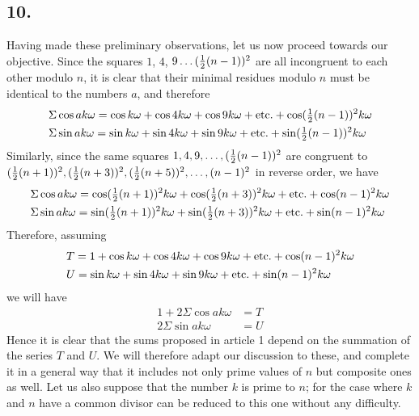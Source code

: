 \documentclass[twoside,12pt]{memoir}
\let\oldfrac\frac
\def\frac#1#2{\mathchoice{\tfrac{#1}{#2}}{\oldfrac{#1}{#2}}{\genfrac{}{}{}{2}{#1}{#2\mathstrut}}{\genfrac{}{}{}{3}{#1}{#2\mathstrut}}}
\begin{document}
\subsection*{10.}

Having made these preliminary observations, let us now proceed towards our objective. Since the squares \(1\), \(4\), \(9 \ldots (\frac{1}{2}(n-1))^2\) are all incongruent to each other modulo \(n\), it is clear that their minimal residues modulo \(n\) must be identical to the numbers \(a\), and therefore
\[\begin{aligned}
&\Sigma \cos a k \omega=\cos k \omega+\cos 4 k \omega+\cos 9 k \omega+\text{etc{.}}+\cos (\frac{1}{2}(n-1))^2 k \omega \\
&\Sigma \sin a k \omega=\sin k \omega+\sin 4 k \omega+\sin 9 k \omega+\text{etc{.}}+\sin (\frac{1}{2}(n-1))^2 k \omega
\end{aligned}\]
Similarly, since the same squares \(1, 4, 9, \ldots, (\frac{1}{2}(n-1))^2\) are congruent to \((\frac{1}{2}(n+1))^2, (\frac{1}{2}(n+3))^2, (\frac{1}{2}(n+5))^2, \ldots, (n-1)^2\) in reverse order, we have\pagebreak%
\[\begin{aligned}
&\Sigma \cos a k \omega=\cos (\frac{1}{2}(n+1))^2 k \omega+\cos (\frac{1}{2}(n+3))^2 k \omega+\text{etc{.}}+\cos (n-1)^2 k \omega \\
&\Sigma \sin a k \omega=\sin (\frac{1}{2}(n+1))^2 k \omega+\sin (\frac{1}{2}(n+3))^2 k \omega+\text{etc{.}}+\sin (n-1)^2 k \omega
\end{aligned}\]
Therefore, assuming
\[\begin{alignedat}[t]{2}
&T=1+\cos k \omega+\cos 4 k \omega+\cos 9 k \omega+\text{etc{.}}+\cos (n-1)^2 k \omega \\
& U= \sin k \omega+\sin 4 k \omega+\sin 9 k \omega+\text{etc{.}}+\sin (n-1)^2 k \omega
\end{alignedat}\]
we will have
\[\begin{aligned}
1+2 \Sigma \cos a k \omega & =T \\
2 \Sigma \sin a k \omega & =U
\end{aligned}\]
Hence it is clear that the sums proposed in article 1 depend on the summation of the series \(T\) and \(U\). We will therefore adapt our discussion to these, and complete it in a general way that it includes not only prime values of \(n\) but composite ones as well. Let us also suppose that the number \(k\) is prime to \(n\); for the case where \(k\) and \(n\) have a common divisor can be reduced to this one without any difficulty.
\end{document}
